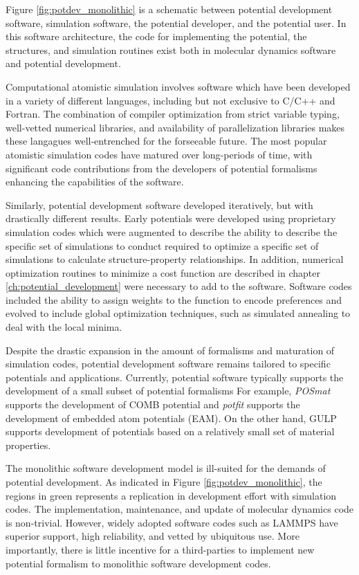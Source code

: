 Figure \ref{fig:potdev_monolithic} is a schematic between potential development software, simulation software, the potential developer, and the potential user.  In this software architecture, the code for implementing the potential, the structures, and simulation routines exist both in molecular dynamics software and potential development.

Computational atomistic simulation involves software which have been developed in a variety of different languages, including but not exclusive to C/C++ and Fortran.  The combination of compiler optimization from strict variable typing, well-vetted numerical libraries, and availability of parallelization libraries makes these langagues well-entrenched for the forseeable future.  The most popular atomistic simulation codes have matured over long-periods of time, with significant code contributions from the developers of potential formalisms enhancing the capabilities of the software.

Similarly, potential development software developed iteratively, but with drastically different results.  Early potentials were developed using proprietary simulation codes which were augmented to describe the ability to describe the specific set of simulations to conduct required to optimize a specific set of simulations to calculate structure-property relationships.   In addition, numerical optimization routines to minimize a cost function are described in chapter \ref{ch:potential_development} were necessary to add to the software.  Software codes included the ability to assign weights to the function to encode preferences and evolved to include global optimization techniques, such as simulated annealing\cite{kirkpatrick1983_simmulated_annealing} to deal with the local minima.

Despite the drastic expansion in the amount of formalisms and maturation of simulation codes, potential development software remains tailored to specific potentials and applications.
Currently, potential software typically supports the development of a small subset of potential formalisms
For example, \emph{POSmat}\cite{martinez2016_posmat} supports the development of COMB potential and \emph{potfit}\cite{brommer2015_potfit} supports the development of embedded atom potentials (EAM).  On the other hand, GULP supports development of potentials based on a relatively small set of material properties.

The monolithic software development model is ill-suited for the demands of potential development.  As indicated in Figure \ref{fig:potdev_monolithic}, the regions in green represents a replication in development effort with simulation codes.  The implementation, maintenance, and update of molecular dynamics code is non-trivial.  However, widely adopted software codes such as LAMMPS have superior support, high reliability, and vetted by ubiquitous use.  More importantly,  there is little incentive for a third-parties to implement new potential formalism to monolithic software development codes.

